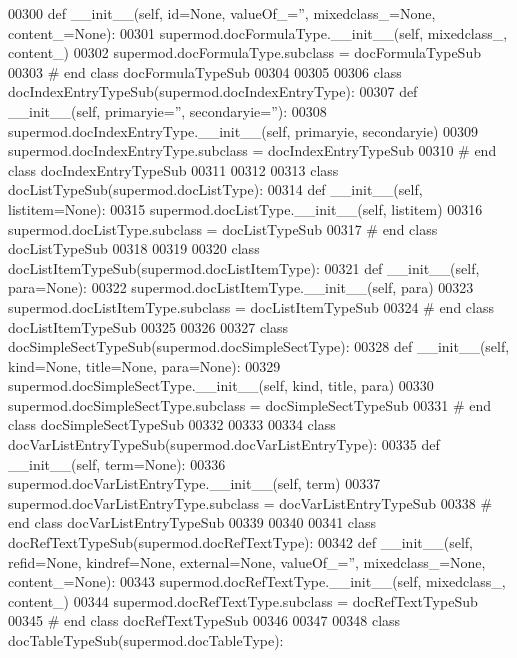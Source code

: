 \begin{DoxyCode}
00300     \textcolor{keyword}{def }__init__(self, id=None, valueOf\_='', mixedclass\_=None, content\_=None):
00301         supermod.docFormulaType.\_\_init\_\_(self, mixedclass\_, content\_)
00302 supermod.docFormulaType.subclass = docFormulaTypeSub
00303 \textcolor{comment}{# end class docFormulaTypeSub}
00304 
00305 
00306 \textcolor{keyword}{class }docIndexEntryTypeSub(supermod.docIndexEntryType):
00307     \textcolor{keyword}{def }__init__(self, primaryie='', secondaryie=''):
00308         supermod.docIndexEntryType.\_\_init\_\_(self, primaryie, secondaryie)
00309 supermod.docIndexEntryType.subclass = docIndexEntryTypeSub
00310 \textcolor{comment}{# end class docIndexEntryTypeSub}
00311 
00312 
00313 \textcolor{keyword}{class }docListTypeSub(supermod.docListType):
00314     \textcolor{keyword}{def }__init__(self, listitem=None):
00315         supermod.docListType.\_\_init\_\_(self, listitem)
00316 supermod.docListType.subclass = docListTypeSub
00317 \textcolor{comment}{# end class docListTypeSub}
00318 
00319 
00320 \textcolor{keyword}{class }docListItemTypeSub(supermod.docListItemType):
00321     \textcolor{keyword}{def }__init__(self, para=None):
00322         supermod.docListItemType.\_\_init\_\_(self, para)
00323 supermod.docListItemType.subclass = docListItemTypeSub
00324 \textcolor{comment}{# end class docListItemTypeSub}
00325 
00326 
00327 \textcolor{keyword}{class }docSimpleSectTypeSub(supermod.docSimpleSectType):
00328     \textcolor{keyword}{def }__init__(self, kind=None, title=None, para=None):
00329         supermod.docSimpleSectType.\_\_init\_\_(self, kind, title, para)
00330 supermod.docSimpleSectType.subclass = docSimpleSectTypeSub
00331 \textcolor{comment}{# end class docSimpleSectTypeSub}
00332 
00333 
00334 \textcolor{keyword}{class }docVarListEntryTypeSub(supermod.docVarListEntryType):
00335     \textcolor{keyword}{def }__init__(self, term=None):
00336         supermod.docVarListEntryType.\_\_init\_\_(self, term)
00337 supermod.docVarListEntryType.subclass = docVarListEntryTypeSub
00338 \textcolor{comment}{# end class docVarListEntryTypeSub}
00339 
00340 
00341 \textcolor{keyword}{class }docRefTextTypeSub(supermod.docRefTextType):
00342     \textcolor{keyword}{def }__init__(self, refid=None, kindref=None, external=None, valueOf\_='', mixedclass\_=None, 
      content\_=None):
00343         supermod.docRefTextType.\_\_init\_\_(self, mixedclass\_, content\_)
00344 supermod.docRefTextType.subclass = docRefTextTypeSub
00345 \textcolor{comment}{# end class docRefTextTypeSub}
00346 
00347 
00348 \textcolor{keyword}{class }docTableTypeSub(supermod.docTableType):

\end{DoxyCode}
